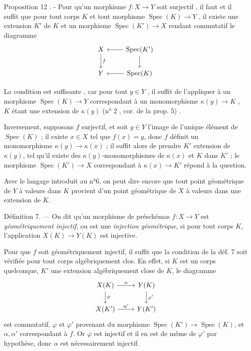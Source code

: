 Proposition 12 . - Pour qu'un morphisme $f : X \to Y$ soit surjectif , il faut et il suffit que pour tout corps $K$ et tout morphisme $\operatorname{Spec}(K) \to Y$ , il existe une extension $K'$ de $K$ et un morphisme $\operatorname{Spec}(K') \to X$ rendant commutatif le diagramme
$$
\begin{tikzcd}
X \arrow[d, "f"] & \operatorname{Spec}(K') \arrow[l] \arrow[d] \\
Y & \operatorname{Spec}(K) \arrow[l]
\end{tikzcd}
$$

La condition est suffisante , car pour tout $y \in Y$ , il suffit de l'appliquer à un morphisme $\operatorname{Spec}(K) \to Y$ correspondant à un monomorphisme $\kappa(y) \to K$ , $K$ étant une extension de $\kappa(y)$ (n° 2 , cor. de la prop. 5) .

\newpage


Inversement, supposons $f$ surjectif, et soit $y \in Y$ l'image de l'unique élément de $\operatorname{Spec}(K)$ ; il existe $x \in X$ tel que $f(x)=y$, donc $f$ définit un monomorphisme $\kappa(y) \to \kappa(x)$ ; il suffit alors de prendre $K'$ extension de $\kappa(y)$, tel qu'il existe des $\kappa(y)$-monomorphismes de $\kappa(x)$ et $K$ dans $K'$ ; le morphisme $\operatorname{Spec}(K') \to X$ correspondant à $\kappa(x) \to K'$ répond à la question.

Avec le langage introduit au n°6, on peut dire encore que tout point géométrique de $Y$ à valeurs dans $K$ provient d'un point géométrique de $X$ à valeurs dans une extension de $K$.

Définition 7. — On dit qu'un morphisme de préschémas $f : X \to Y$ est \emph{géométriquement injectif}, ou est une \emph{injection géométrique}, si pour tout corps $K$, l'application $X(K) \to Y(K)$ est injective.

Pour que $f$ soit géométriquement injectif, il suffit que la condition de la déf. 7 soit vérifiée pour tout corps algébriquement clos. En effet, si $K$ est un corps quelconque, $K'$ une extension algébriquement close de $K$, le diagramme
$$\begin{tikzcd}
X(K) \arrow[r, "\alpha"] \arrow[d, "\varphi"] & Y(K) \arrow[d, "\varphi'"] \\
X(K') \arrow[r, "\alpha'"] & Y(K')
\end{tikzcd}$$
est commutatif, $\varphi$ et $\varphi'$ provenant du morphisme $\operatorname{Spec}(K') \to \operatorname{Spec}(K)$, et $\alpha, \alpha'$ correspondant à $f$. Or $\varphi$ est injectif et il en est de même de $\varphi'$ par hypothèse, donc $\alpha$ est nécessairement injectif.

